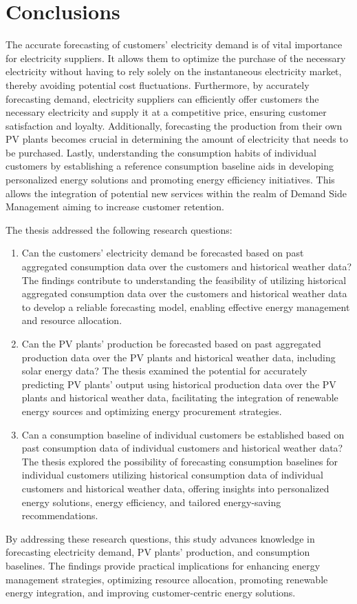 \chapter{Conclusions}
\label{cha:conclusions}
\vspace{0.4 cm}

The accurate forecasting of customers' electricity demand is of vital importance for electricity suppliers.
It allows them to optimize the purchase of the necessary electricity without having to rely solely on the instantaneous electricity market, thereby avoiding potential cost fluctuations.
Furthermore, by accurately forecasting demand, electricity suppliers can efficiently offer customers the necessary electricity and supply it at a competitive price, ensuring customer satisfaction and loyalty.
Additionally, forecasting the production from their own PV plants becomes crucial in determining the amount of electricity that needs to be purchased.
Lastly, understanding the consumption habits of individual customers by establishing a reference consumption baseline aids in developing personalized energy solutions and promoting energy efficiency initiatives.
This allows the integration of potential new services within the realm of Demand Side Management aiming to increase customer retention.

The thesis addressed the following research questions:
\begin{enumerate}
  \item Can the customers' electricity demand be forecasted based on past aggregated consumption data over the customers and historical weather data? The findings contribute to understanding the feasibility of utilizing historical aggregated consumption data over the customers and historical weather data to develop a reliable forecasting model, enabling effective energy management and resource allocation.
  \item Can the PV plants' production be forecasted based on past aggregated production data over the PV plants and historical weather data, including solar energy data? The thesis examined the potential for accurately predicting PV plants' output using historical production data over the PV plants and historical weather data, facilitating the integration of renewable energy sources and optimizing energy procurement strategies.
  \item Can a consumption baseline of individual customers be established based on past consumption data of individual customers and historical weather data? The thesis explored the possibility of forecasting consumption baselines for individual customers utilizing historical consumption data of individual customers and historical weather data, offering insights into personalized energy solutions, energy efficiency, and tailored energy-saving recommendations.
\end{enumerate}
By addressing these research questions, this study advances knowledge in forecasting electricity demand, PV plants' production, and consumption baselines.
The findings provide practical implications for enhancing energy management strategies, optimizing resource allocation, promoting renewable energy integration, and improving customer-centric energy solutions.

